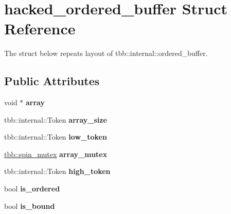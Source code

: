 \hypertarget{structhacked__ordered__buffer}{}\section{hacked\+\_\+ordered\+\_\+buffer Struct Reference}
\label{structhacked__ordered__buffer}


The struct below repeats layout of tbb\+::internal\+::ordered\+\_\+buffer.  


\subsection*{Public Attributes}
\begin{DoxyCompactItemize}
\item 
\hypertarget{structhacked__ordered__buffer_a26cfae3c90992fc754bd1351338afe4a}{}void $\ast$ {\bfseries array}\label{structhacked__ordered__buffer_a26cfae3c90992fc754bd1351338afe4a}

\item 
\hypertarget{structhacked__ordered__buffer_a813d61fcd766e63732d1fe0a72c8a191}{}tbb\+::internal\+::\+Token {\bfseries array\+\_\+size}\label{structhacked__ordered__buffer_a813d61fcd766e63732d1fe0a72c8a191}

\item 
\hypertarget{structhacked__ordered__buffer_ac82863e2901ef3040b4c74c3438e8777}{}tbb\+::internal\+::\+Token {\bfseries low\+\_\+token}\label{structhacked__ordered__buffer_ac82863e2901ef3040b4c74c3438e8777}

\item 
\hypertarget{structhacked__ordered__buffer_a51bbfe6ad950bed99884c217ff7008f3}{}\hyperlink{classtbb_1_1spin__mutex}{tbb\+::spin\+\_\+mutex} {\bfseries array\+\_\+mutex}\label{structhacked__ordered__buffer_a51bbfe6ad950bed99884c217ff7008f3}

\item 
\hypertarget{structhacked__ordered__buffer_ad4d91bb3f1e3ad2992d90a3f6311ee28}{}tbb\+::internal\+::\+Token {\bfseries high\+\_\+token}\label{structhacked__ordered__buffer_ad4d91bb3f1e3ad2992d90a3f6311ee28}

\item 
\hypertarget{structhacked__ordered__buffer_a89480ddd1c1cd2c38e25f9650cedca32}{}bool {\bfseries is\+\_\+ordered}\label{structhacked__ordered__buffer_a89480ddd1c1cd2c38e25f9650cedca32}

\item 
\hypertarget{structhacked__ordered__buffer_a6c29e76df8de252da7dc7a5220960a77}{}bool {\bfseries is\+\_\+bound}\label{structhacked__ordered__buffer_a6c29e76df8de252da7dc7a5220960a77}

\end{DoxyCompactItemize}


